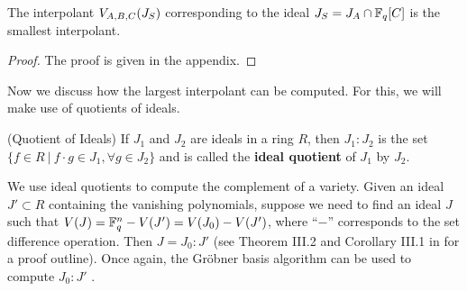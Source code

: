 
\begin{Theorem}
\label{thm:smallest}
The interpolant ${V_{A,B,C}}(J_S)$ corresponding to the ideal %
$J_S = J_A \cap {\mathbb{F}}_{q}[C]$ is the smallest interpolant.
\end{Theorem}

\begin{proof} 
The proof is given in the appendix. 


\end{proof}

Now we discuss how the largest interpolant can be
computed. For this, we will make use of quotients of ideals. 

\begin{Definition}
\label{def:quo}
({Quotient of Ideals}) If $J_1$ and $J_2$ are ideals in a ring $R$,
then $J_1:J_2$ is the set 
  $\{f \in R \ |\ f\cdot g \in J_1, \forall g \in J_2\}$ %
and is called the {\bf ideal quotient} of $J_1$ by $J_2$.
\end{Definition}

We use ideal quotients to compute the complement of a variety. Given
an ideal $J' \subset R$ containing the vanishing polynomials, suppose
we need to find an ideal $J$ such that $V(J) = {\mathbb{F}}_{q}^n - V(J') = V(J_0)
- V(J')$, where ``$-$'' corresponds to the set difference
operation. Then $J = J_0 : J'$ (see Theorem III.2 and Corollary III.1
in \cite{xiaojun:hldvt2016} for a proof outline). Once again, the
Gr\"obner basis algorithm can be used to compute $J_0:J'$ 
\cite{ideals:book}.  

